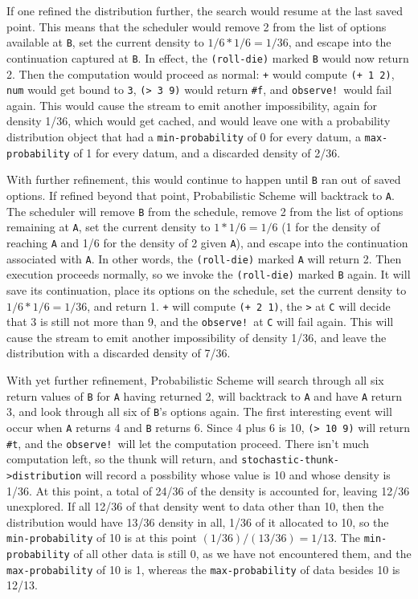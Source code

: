 \documentclass[10pt]{sigplanconf}
\newcommand{\code}[1]{\texttt{#1}}
\begin{document}
If one refined the distribution further, the search would resume at
the last saved point.  This means that the scheduler would remove 2
from the list of options available at \code{B}, set the current
density to $1/6 * 1/6 = 1/36$, and escape into the continuation
captured at \code{B}.  In effect, the \code{(roll-die)} marked
\code{B} would now return 2.  Then the computation would proceed as
normal: \code{+} would compute \code{(+ 1 2)}, \code{num} would get
bound to \code{3}, \code{(> 3 9)} would return \code{\#f}, and
\code{observe!}\ would fail again.  This would cause the stream to
emit another impossibility, again for density 1/36, which would get
cached, and would leave one with a probability distribution object
that had a \code{min-probability} of 0 for every datum, a
\code{max-probability} of 1 for every datum, and a discarded density
of 2/36.

With further refinement, this would continue to happen until \code{B} ran
out of saved options.  If refined beyond that point, Probabilistic Scheme will
backtrack to \code{A}.  The scheduler will remove \code{B} from the
schedule, remove 2 from the list of options remaining at \code{A}, set
the current density to $1 * 1/6 = 1/6$ (1 for the density of reaching
\code{A} and 1/6 for the density of 2 given \code{A}), and escape into
the continuation associated with \code{A}.  In other words, the
\code{(roll-die)} marked \code{A} will return 2.  Then execution
proceeds normally, so we invoke the \code{(roll-die)} marked \code{B}
again.  It will save its continuation, place its options on the
schedule, set the current density to $1/6 * 1/6 = 1/36$, and return 1.
\code{+} will compute \code{(+ 2 1)}, the \code{>} at \code{C} will
decide that 3 is still not more than 9, and the \code{observe!}\ at
\code{C} will fail again.  This will cause the stream to emit another
impossibility of density 1/36, and leave the distribution with
a discarded density of 7/36.

With yet further refinement, Probabilistic Scheme will search through all six
return values of \code{B} for \code{A} having returned 2, will
backtrack to \code{A} and have \code{A} return 3, and look through all
six of \code{B}'s options again.  The first interesting event will
occur when \code{A} returns 4 and \code{B} returns 6.  Since 4 plus 6
is 10, \code{(> 10 9)} will return \code{\#t}, and the
\code{observe!}\ will let the computation proceed.  There isn't much
computation left, so the thunk will return, and
\code{stochastic-thunk->distribution} will record a possbility whose
value is 10 and whose density is 1/36.  At this point, a total of 24/36
of the density is accounted for, leaving 12/36 unexplored.  If all 12/36
of that density went to data other than 10, then the distribution would
have 13/36 density in all, 1/36 of it allocated to 10, so the
\code{min-probability} of 10 is at this point $(1/36)/(13/36) = 1/13$.
The \code{min-probability} of all other data is still 0, as we have
not encountered them, and the \code{max-probability} of 10 is 1,
whereas the \code{max-probability} of data besides 10 is 12/13.
\end{document}
